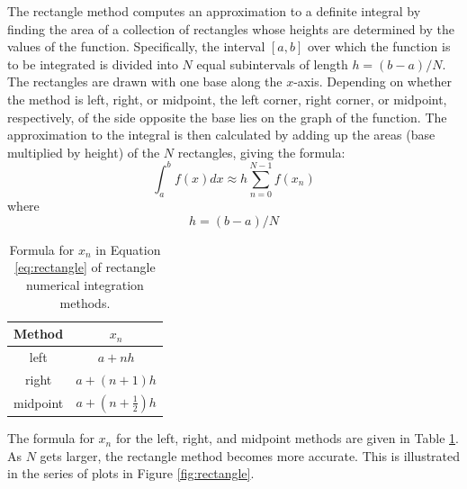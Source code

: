 \label{Rectangle_Integration}

The rectangle method computes an approximation to a 
definite integral by finding the area of a collection of rectangles whose heights are determined 
by the values of the function.  Specifically, the interval $[a,b]$ over which the function is to 
be integrated is divided into $N$ equal subintervals of length $h = (b-a)/N$. The rectangles are 
drawn with one base along the $x$-axis. Depending on whether the method is left, right, or midpoint,
the left corner, right corner, or midpoint, respectively, of the side opposite the base lies on the 
graph of the function. The approximation to the integral is 
then calculated by adding up the areas (base multiplied by height) of the $N$ rectangles, giving the formula:
\begin{equation}
\int_a^b f(x) dx \approx h \sum_{n=0}^{N-1} f(x_n) \label{eq:rectangle}
\end{equation}
where
\begin{equation}
h=(b-a)/N 
\end{equation}

\begin{table}[htbp]
\centering
\caption{Formula for $x_n$ in Equation \ref{eq:rectangle} of rectangle numerical integration methods.} \label{tab:xn-rectangle}
\begin{tabular}{cc}
\textbf{Method} & \textbf{$x_n$} \\ \toprule
left & $a+nh$ \\ \midrule
right & $a+(n+1)h$ \\ \midrule
midpoint & $a+\left(n + \frac{1}{2}\right)h$ \\ \bottomrule
\end{tabular}
\end{table}

The formula for $x_n$ for the left, right, and midpoint methods are given in Table \ref{tab:xn-rectangle}.
As $N$ gets larger, the rectangle method becomes more accurate. This is illustrated in the series of plots
in Figure \ref{fig:rectangle}.

